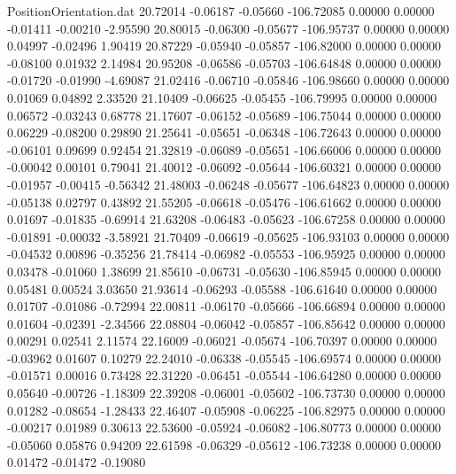 \begin{filecontents}{PositionOrientation.dat}
  20.72014   -0.06187   -0.05660  -106.72085    0.00000    0.00000   -0.01411   -0.00210   -2.95590
  20.80015   -0.06300   -0.05677  -106.95737    0.00000    0.00000    0.04997   -0.02496    1.90419
  20.87229   -0.05940   -0.05857  -106.82000    0.00000    0.00000   -0.08100    0.01932    2.14984
  20.95208   -0.06586   -0.05703  -106.64848    0.00000    0.00000   -0.01720   -0.01990   -4.69087
  21.02416   -0.06710   -0.05846  -106.98660    0.00000    0.00000    0.01069    0.04892    2.33520
  21.10409   -0.06625   -0.05455  -106.79995    0.00000    0.00000    0.06572   -0.03243    0.68778
  21.17607   -0.06152   -0.05689  -106.75044    0.00000    0.00000    0.06229   -0.08200    0.29890
  21.25641   -0.05651   -0.06348  -106.72643    0.00000    0.00000   -0.06101    0.09699    0.92454
  21.32819   -0.06089   -0.05651  -106.66006    0.00000    0.00000   -0.00042    0.00101    0.79041
  21.40012   -0.06092   -0.05644  -106.60321    0.00000    0.00000   -0.01957   -0.00415   -0.56342
  21.48003   -0.06248   -0.05677  -106.64823    0.00000    0.00000   -0.05138    0.02797    0.43892
  21.55205   -0.06618   -0.05476  -106.61662    0.00000    0.00000    0.01697   -0.01835   -0.69914
  21.63208   -0.06483   -0.05623  -106.67258    0.00000    0.00000   -0.01891   -0.00032   -3.58921
  21.70409   -0.06619   -0.05625  -106.93103    0.00000    0.00000   -0.04532    0.00896   -0.35256
  21.78414   -0.06982   -0.05553  -106.95925    0.00000    0.00000    0.03478   -0.01060    1.38699
  21.85610   -0.06731   -0.05630  -106.85945    0.00000    0.00000    0.05481    0.00524    3.03650
  21.93614   -0.06293   -0.05588  -106.61640    0.00000    0.00000    0.01707   -0.01086   -0.72994
  22.00811   -0.06170   -0.05666  -106.66894    0.00000    0.00000    0.01604   -0.02391   -2.34566
  22.08804   -0.06042   -0.05857  -106.85642    0.00000    0.00000    0.00291    0.02541    2.11574
  22.16009   -0.06021   -0.05674  -106.70397    0.00000    0.00000   -0.03962    0.01607    0.10279
  22.24010   -0.06338   -0.05545  -106.69574    0.00000    0.00000   -0.01571    0.00016    0.73428
  22.31220   -0.06451   -0.05544  -106.64280    0.00000    0.00000    0.05640   -0.00726   -1.18309
  22.39208   -0.06001   -0.05602  -106.73730    0.00000    0.00000    0.01282   -0.08654   -1.28433
  22.46407   -0.05908   -0.06225  -106.82975    0.00000    0.00000   -0.00217    0.01989    0.30613
  22.53600   -0.05924   -0.06082  -106.80773    0.00000    0.00000   -0.05060    0.05876    0.94209
  22.61598   -0.06329   -0.05612  -106.73238    0.00000    0.00000    0.01472   -0.01472   -0.19080

\end{filecontents}
